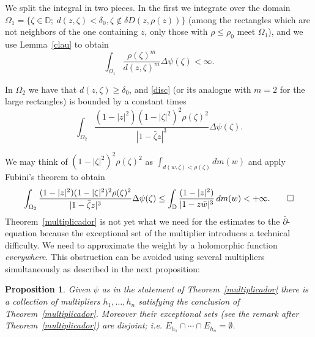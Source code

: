 \documentclass[12pt,twoside,final,psamsfonts]{amsart}
\theoremstyle{plain}
\newtheorem{prop}{Proposition}
\theoremstyle{remark}
\theoremstyle{definition}
\newcommand{\D}{{\mathbb D}}
\begin{document}
We
split the integral in two pieces. In the first we integrate over the domain
$\Omega_1=\{\zeta\in \D;\ d(z,\zeta)<\delta_0, \zeta\notin\delta
D(z,\rho(z))\}$ (among the rectangles which are not neighbors of the one
containing $z$, only those with $\rho\le\rho_0$ meet $\Omega_1$),  and we use Lemma~\ref{clau} to obtain
\[
\int_{\Omega_1}\frac{\rho(\zeta)^m}{d(z,\zeta)^m}\Delta\psi(\zeta)<\infty.
\]

In $\Omega_2$ we have that $d(z,\zeta)\ge\delta_0$, and \eqref{disc} (or its
analogue with $m=2$ for the large rectangles)
is bounded by a constant times
\[
\int_{\Omega_2}\frac{(1-|z|^2) (1-|\zeta|^2)^2\rho(\zeta)^2}{|1-\bar\zeta z|^3}
\Delta\psi(\zeta).
\]

We may think of $(1-|\zeta|^2)^2\rho(\zeta)^2$ as
$\int_{d(w,\zeta)<\rho(\zeta)}dm(w)$ and apply Fubini's theorem to obtain 
\[
\int_{\Omega_2}\frac{(1-|z|^2) (1-|\zeta|^2)^2\rho(\zeta)^2}{|1-\bar\zeta z|^3}
\Delta\psi(\zeta)\le \int_{\D} \frac{(1-|z|^2)}{|1-z\bar w|^3}\, dm(w)<+\infty.
\qed
\]
Theorem~\ref{multiplicador} is not yet what we need for the estimates to the
$\bar\partial$-equation because the exceptional set of the multiplier introduces
a technical difficulty. We need to approximate the weight by a holomorphic
function \emph{everywhere}. This obstruction 
can be avoided using several multipliers
simultaneously as
described in the next proposition:
\begin{prop}\label{tecnic} Given $\psi$ as in the statement of
Theorem~\ref{multiplicador} there is a
collection of multipliers $h_1,\ldots,h_n$ satisfying the conclusion of
Theorem~\ref{multiplicador}. Moreover their exceptional sets 
(see the remark after
Theorem~\ref{multiplicador}) are disjoint; i.e.
$E_{h_1}\cap\cdots\cap E_{h_n}=\emptyset$. 
\end{prop}
\end{document}
